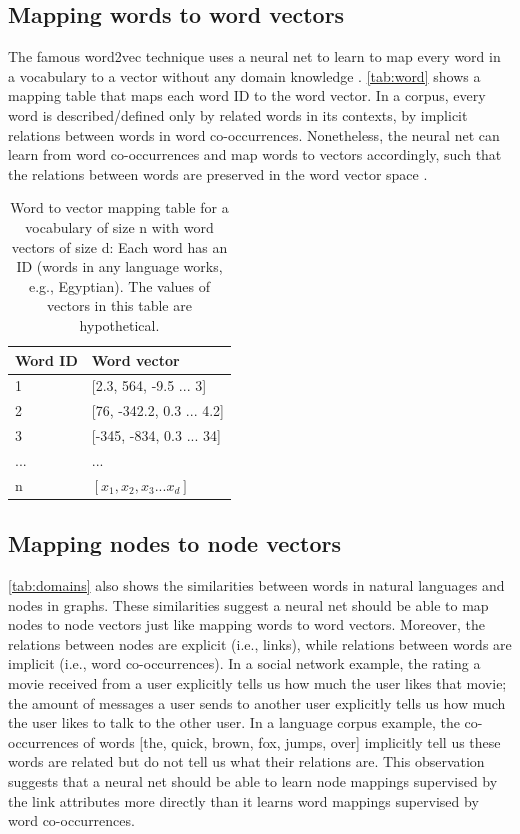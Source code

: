 \documentclass[twocolumn]{article}
\begin{document}
\subsection{Mapping words to word vectors}
The famous word2vec technique uses a neural net to learn to map every word in a 
vocabulary to a vector without any domain knowledge \cite{mikolov2013efficient}.
\autoref{tab:word} shows a mapping table that maps each word ID to the word 
vector.
In a corpus, every word is described/defined only by related words in its 
contexts, by implicit relations between words in word co-occurrences.
Nonetheless, the neural net can learn from word co-occurrences and map words to 
vectors accordingly,
such that the relations between words are preserved in the word vector space 
\cite{mikolov2013distributed}.
\begin{table}[h]
	\centering
	\caption{Word to vector mapping table for a vocabulary of size n with word 
		vectors of size d:
		Each word has an ID (words in any language works, e.g., Egyptian).
		The values of vectors in this table are hypothetical.}
	\begin{tabularx}{0.5\textwidth}{|X|X|} \hline
		\textbf{Word ID} & \textbf{Word vector} \\ \hline
		1 & [2.3, 564, -9.5 ... 3] \\ \hline
		2 & [76, -342.2, 0.3 ... 4.2] \\ \hline
		3 & [-345, -834, 0.3 ... 34] \\ \hline
		... & ... \\ \hline
		n & $ [x_1, x_2, x_3 ... x_d] $ \\ \hline
	\end{tabularx}
	\label{tab:word}
\end{table}

\subsection{Mapping nodes to node vectors}
\autoref{tab:domains} also shows the similarities between words in natural 
languages and nodes in graphs.
These similarities suggest a neural net should be able to map nodes to node 
vectors just like mapping words to word vectors.
Moreover, the relations between nodes are explicit (i.e., links),
while relations between words are implicit (i.e., word co-occurrences).
In a social network example, the rating a movie received from a user explicitly 
tells us how much the user likes that movie;
the amount of messages a user sends to another user explicitly tells us how 
much the user likes to talk to the other user.
In a language corpus example, the co-occurrences of words [the, quick, brown, 
fox, jumps, over] implicitly tell us these words are related but do not tell us 
what their relations are.
This observation suggests that a neural net should be able to learn node 
mappings supervised by the link attributes more directly than it learns word 
mappings supervised by word co-occurrences.
\end{document}
